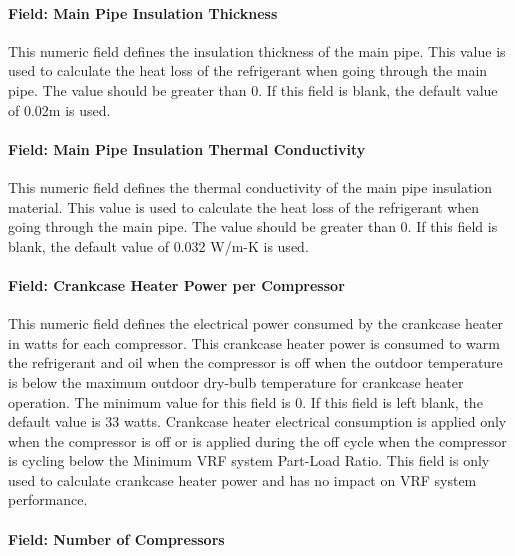 \paragraph{Field: Main Pipe Insulation Thickness}

This numeric field defines the insulation thickness of the main pipe. This value is used to calculate the heat loss of the refrigerant when going through the main pipe. The value should be greater than 0. If this field is blank, the default value of 0.02m is used.

\paragraph{Field: Main Pipe Insulation Thermal Conductivity}

This numeric field defines the thermal conductivity of the main pipe insulation material. This value is used to calculate the heat loss of the refrigerant when going through the main pipe. The value should be greater than 0. If this field is blank, the default value of 0.032 W/m-K is used.

\paragraph{Field: Crankcase Heater Power per Compressor}

This numeric field defines the electrical power consumed by the crankcase heater in watts for each compressor. This crankcase heater power is consumed to warm the refrigerant and oil when the compressor is off when the outdoor temperature is below the maximum outdoor dry-bulb temperature for crankcase heater operation. The minimum value for this field is 0. If this field is left blank, the default value is 33 watts. Crankcase heater electrical consumption is applied only when the compressor is off or is applied during the off cycle when the compressor is cycling below the Minimum VRF system Part-Load Ratio. This field is only used to calculate crankcase heater power and has no impact on VRF system performance.

\paragraph{Field: Number of Compressors}

